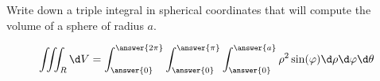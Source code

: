\documentclass{ximera}
\begin{document}
\begin{question}
  Write down a triple integral in spherical coordinates that will
  compute the volume of a sphere of radius $a$.
  \begin{prompt}
  \[
  \iiint_R \d V = \int_{\answer{0}}^{\answer{2\pi}}
  \int_{\answer{0}}^{\answer{\pi}}
  \int_{\answer{0}}^{\answer{a}}
  \rho^2 \sin(\varphi)\d\rho\d\varphi\d\theta
  \]
  \end{prompt}
\end{question}


        
\end{document}
